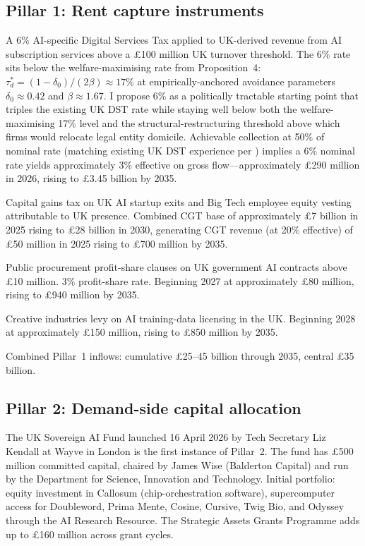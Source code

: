 \documentclass[11pt,letterpaper]{article}
\theoremstyle{remark}
\begin{document}
\subsection{Pillar 1: Rent capture instruments}

A 6\% {AI}-specific Digital Services Tax applied to {UK}-derived revenue from {AI} subscription services above a \pounds100 million {UK} turnover threshold. The 6\% rate sits below the welfare-maximising rate from Proposition~4: $\tau_d^* = (1 - \delta_0)/(2\beta) \approx 17\%$ at empirically-anchored avoidance parameters $\delta_0 \approx 0.42$ and $\beta \approx 1.67$. I propose 6\% as a politically tractable starting point that triples the existing {UK} {DST} rate while staying well below both the welfare-maximising 17\% level and the structural-restructuring threshold above which firms would relocate legal entity domicile. Achievable collection at 50\% of nominal rate (matching existing {UK} {DST} experience per \citet{hmrc_2020}) implies a 6\% nominal rate yields approximately 3\% effective on gross flow---approximately \pounds290 million in 2026, rising to \pounds3.45 billion by 2035.

Capital gains tax on {UK} {AI} startup exits and Big Tech employee equity vesting attributable to {UK} presence. Combined {CGT} base of approximately \pounds7 billion in 2025 rising to \pounds28 billion in 2030, generating {CGT} revenue (at 20\% effective) of \pounds50 million in 2025 rising to \pounds700 million by 2035.

Public procurement profit-share clauses on {UK} government {AI} contracts above \pounds10 million. 3\% profit-share rate. Beginning 2027 at approximately \pounds80 million, rising to \pounds940 million by 2035.

Creative industries levy on {AI} training-data licensing in the {UK}. Beginning 2028 at approximately \pounds150 million, rising to \pounds850 million by 2035.

Combined Pillar~1 inflows: cumulative \pounds25--45 billion through 2035, central \pounds35 billion.

\subsection{Pillar 2: Demand-side capital allocation}

The {UK} Sovereign {AI} Fund launched 16 April 2026 by Tech Secretary Liz Kendall at Wayve in London is the first instance of Pillar~2. The fund has \pounds500 million committed capital, chaired by James Wise (Balderton Capital) and run by the Department for Science, Innovation and Technology. Initial portfolio: equity investment in Callosum (chip-orchestration software), supercomputer access for Doubleword, Prima Mente, Cosine, Cursive, Twig Bio, and Odyssey through the {AI} Research Resource. The Strategic Assets Grants Programme \citep{dsit_2026} adds up to \pounds160 million across grant cycles.
\end{document}
